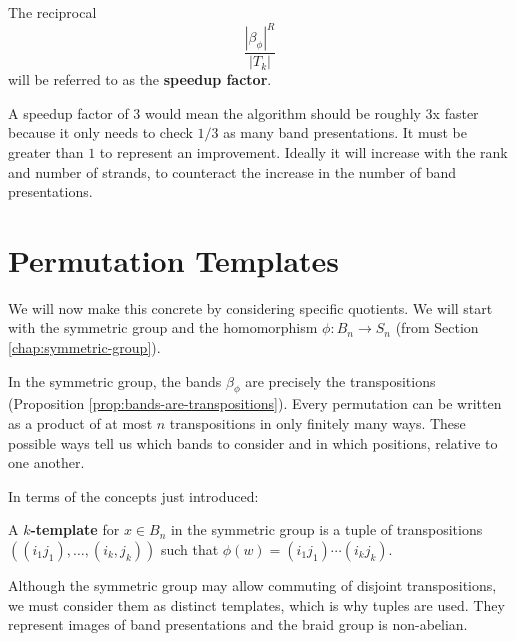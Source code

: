 \documentclass[12pt]{thesis}
\begin{document}
\begin{definition}
    The reciprocal
    \begin{equation}
        \label{eq:how-many-templates}
        \frac{|\beta_{\phi}|^{R}}{|T_{k}|}
    \end{equation}
    will be referred to as the \textbf{speedup factor}.
\end{definition}

A speedup factor of $3$ would mean
the algorithm should be roughly 3x faster because it only needs to check $1/3$ as many
band presentations.
It must be greater than $1$ to represent an improvement.
Ideally it will increase with the rank
and number of strands, to counteract the increase
in the number of band presentations.

\section{Permutation Templates}

We will now make this concrete by considering specific quotients.
We will start with the symmetric group and the homomorphism $\phi \colon B_{n} \rightarrow S_{n}$
(from Section \ref{chap:symmetric-group}).

In the symmetric group, the bands $\beta_{\phi}$
are precisely the transpositions (Proposition \ref{prop:bands-are-transpositions}).
Every permutation can be written as a product of at most $n$ transpositions
in only finitely many ways.
These possible ways tell us which bands to consider
and in which positions, relative to one another.

In terms of the concepts just introduced:
\begin{definition}
    A \textbf{$k$-template}
    for $x \in B_{n}$ in the symmetric group is a tuple of transpositions $((i_{1} j_{1}), \ldots, (i_{k}, j_{k}))$ such that
$\phi(w) = (i_{1} j_{1}) \cdots (i_{k} j_{k})$.
\end{definition}
Although the symmetric group may allow commuting of disjoint transpositions, we must consider
them as distinct templates, which is why tuples are used.
They represent images of band presentations and the braid group is non-abelian.
\end{document}
